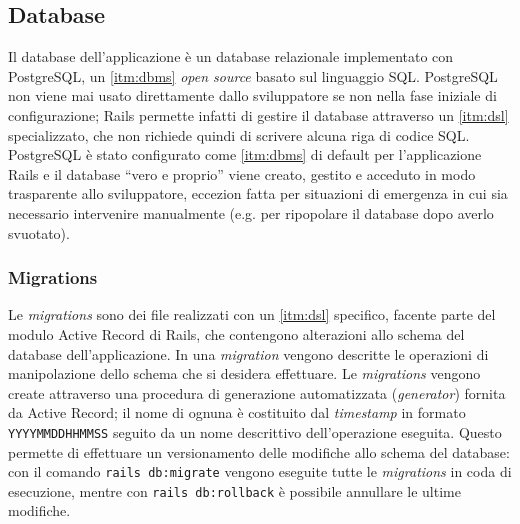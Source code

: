\subsection{Database}
Il database dell'applicazione è un database relazionale implementato con PostgreSQL, un \ref{itm:dbms} \textit{open source} basato sul linguaggio SQL. PostgreSQL non viene mai usato direttamente dallo sviluppatore se non nella fase iniziale di configurazione; Rails permette infatti di gestire il database attraverso un \ref{itm:dsl} specializzato, che non richiede quindi di scrivere alcuna riga di codice SQL. PostgreSQL è stato configurato come \ref{itm:dbms} di default per l'applicazione Rails e il database ``vero e proprio'' viene creato, gestito e acceduto in modo trasparente allo sviluppatore, eccezion fatta per situazioni di emergenza in cui sia necessario intervenire manualmente (e.g. per ripopolare il database dopo averlo svuotato).
\subsubsection{Migrations}
Le \textit{migrations} sono dei file realizzati con un \ref{itm:dsl} specifico, facente parte del modulo Active Record di Rails, che contengono alterazioni allo schema del database dell'applicazione. In una \textit{migration} vengono descritte le operazioni di manipolazione dello schema che si desidera effettuare. Le \textit{migrations} vengono create attraverso una procedura di generazione automatizzata (\textit{generator}) fornita da Active Record; il nome di ognuna è costituito dal \textit{timestamp} in formato \texttt{YYYYMMDDHHMMSS} seguito da un nome descrittivo dell'operazione eseguita. Questo permette di effettuare un versionamento delle modifiche allo schema del database: con il comando \texttt{rails db:migrate} vengono eseguite tutte le \textit{migrations} in coda di esecuzione, mentre con \texttt{rails db:rollback} è possibile annullare le ultime modifiche.

